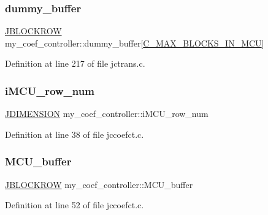 \subsubsection{\texorpdfstring{dummy\_buffer}{dummy\_buffer}}
{\footnotesize\ttfamily \mbox{\hyperlink{jpeglib_8h_a04dea0959d9bd9e8ddad83597161453b}{J\+B\+L\+O\+C\+K\+R\+OW}} my\+\_\+coef\+\_\+controller\+::dummy\+\_\+buffer\mbox{[}\mbox{\hyperlink{jpeglib_8h_a4f270f4efb3fc0bb09f0d5ffa51ca327}{C\+\_\+\+M\+A\+X\+\_\+\+B\+L\+O\+C\+K\+S\+\_\+\+I\+N\+\_\+\+M\+CU}}\mbox{]}}



Definition at line 217 of file jctrans.\+c.

\mbox{\label{structmy__coef__controller_aebf2f540f71a3af44f75544ef474badb}} 
\subsubsection{\texorpdfstring{iMCU\_row\_num}{iMCU\_row\_num}}
{\footnotesize\ttfamily \mbox{\hyperlink{jmorecfg_8h_a04ed4674f6f1d0d50ec241531e38274f}{J\+D\+I\+M\+E\+N\+S\+I\+ON}} my\+\_\+coef\+\_\+controller\+::i\+M\+C\+U\+\_\+row\+\_\+num}



Definition at line 38 of file jccoefct.\+c.

\mbox{\label{structmy__coef__controller_a9eac536791caff80d2c99c204237b0ee}} 
\subsubsection{\texorpdfstring{MCU\_buffer}{MCU\_buffer}}
{\footnotesize\ttfamily \mbox{\hyperlink{jpeglib_8h_a04dea0959d9bd9e8ddad83597161453b}{J\+B\+L\+O\+C\+K\+R\+OW}} my\+\_\+coef\+\_\+controller\+::\+M\+C\+U\+\_\+buffer}



Definition at line 52 of file jccoefct.\+c.

\mbox{\label{structmy__coef__controller_a17ccbcfc9a173194725050412855d7cf}} 

